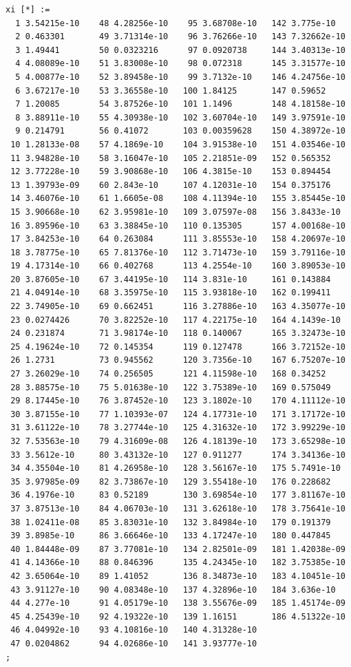 \documentclass{article}
\begin{document}
\begin{verbatim}
xi [*] :=
  1 3.54215e-10    48 4.28256e-10    95 3.68708e-10   142 3.775e-10
  2 0.463301       49 3.71314e-10    96 3.76266e-10   143 7.32662e-10
  3 1.49441        50 0.0323216      97 0.0920738     144 3.40313e-10
  4 4.08089e-10    51 3.83008e-10    98 0.072318      145 3.31577e-10
  5 4.00877e-10    52 3.89458e-10    99 3.7132e-10    146 4.24756e-10
  6 3.67217e-10    53 3.36558e-10   100 1.84125       147 0.59652
  7 1.20085        54 3.87526e-10   101 1.1496        148 4.18158e-10
  8 3.88911e-10    55 4.30938e-10   102 3.60704e-10   149 3.97591e-10
  9 0.214791       56 0.41072       103 0.00359628    150 4.38972e-10
 10 1.28133e-08    57 4.1869e-10    104 3.91538e-10   151 4.03546e-10
 11 3.94828e-10    58 3.16047e-10   105 2.21851e-09   152 0.565352
 12 3.77228e-10    59 3.90868e-10   106 4.3815e-10    153 0.894454
 13 1.39793e-09    60 2.843e-10     107 4.12031e-10   154 0.375176
 14 3.46076e-10    61 1.6605e-08    108 4.11394e-10   155 3.85445e-10
 15 3.90668e-10    62 3.95981e-10   109 3.07597e-08   156 3.8433e-10
 16 3.89596e-10    63 3.38845e-10   110 0.135305      157 4.00168e-10
 17 3.84253e-10    64 0.263084      111 3.85553e-10   158 4.20697e-10
 18 3.78775e-10    65 7.81376e-10   112 3.71473e-10   159 3.79116e-10
 19 4.17314e-10    66 0.402768      113 4.2554e-10    160 3.89053e-10
 20 3.87605e-10    67 3.44195e-10   114 3.831e-10     161 0.143884
 21 4.04914e-10    68 3.35975e-10   115 3.93818e-10   162 0.199411
 22 3.74905e-10    69 0.662451      116 3.27886e-10   163 4.35077e-10
 23 0.0274426      70 3.82252e-10   117 4.22175e-10   164 4.1439e-10
 24 0.231874       71 3.98174e-10   118 0.140067      165 3.32473e-10
 25 4.19624e-10    72 0.145354      119 0.127478      166 3.72152e-10
 26 1.2731         73 0.945562      120 3.7356e-10    167 6.75207e-10
 27 3.26029e-10    74 0.256505      121 4.11598e-10   168 0.34252
 28 3.88575e-10    75 5.01638e-10   122 3.75389e-10   169 0.575049
 29 8.17445e-10    76 3.87452e-10   123 3.1802e-10    170 4.11112e-10
 30 3.87155e-10    77 1.10393e-07   124 4.17731e-10   171 3.17172e-10
 31 3.61122e-10    78 3.27744e-10   125 4.31632e-10   172 3.99229e-10
 32 7.53563e-10    79 4.31609e-08   126 4.18139e-10   173 3.65298e-10
 33 3.5612e-10     80 3.43132e-10   127 0.911277      174 3.34136e-10
 34 4.35504e-10    81 4.26958e-10   128 3.56167e-10   175 5.7491e-10
 35 3.97985e-09    82 3.73867e-10   129 3.55418e-10   176 0.228682
 36 4.1976e-10     83 0.52189       130 3.69854e-10   177 3.81167e-10
 37 3.87513e-10    84 4.06703e-10   131 3.62618e-10   178 3.75641e-10
 38 1.02411e-08    85 3.83031e-10   132 3.84984e-10   179 0.191379
 39 3.8985e-10     86 3.66646e-10   133 4.17247e-10   180 0.447845
 40 1.84448e-09    87 3.77081e-10   134 2.82501e-09   181 1.42038e-09
 41 4.14366e-10    88 0.846396      135 4.24345e-10   182 3.75385e-10
 42 3.65064e-10    89 1.41052       136 8.34873e-10   183 4.10451e-10
 43 3.91127e-10    90 4.08348e-10   137 4.32896e-10   184 3.636e-10
 44 4.277e-10      91 4.05179e-10   138 3.55676e-09   185 1.45174e-09
 45 4.25439e-10    92 4.19322e-10   139 1.16151       186 4.51322e-10
 46 4.04992e-10    93 4.10816e-10   140 4.31328e-10
 47 0.0204862      94 4.02686e-10   141 3.93777e-10
;


\end{verbatim}
\end{document}
